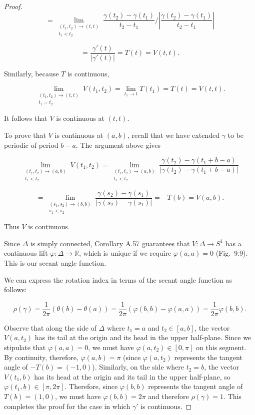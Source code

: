 \begin{proof}
\[
= \lim_{\substack{(t_1,t_2) \to (t,t) \\ t_1 < t_2}} \frac{\gamma(t_2) - \gamma(t_1)}{t_2 - t_1} \bigg/ \left| \frac{\gamma(t_2) - \gamma(t_1)}{t_2 - t_1} \right|
\]

\[
= \frac{\gamma'(t)}{|\gamma'(t)|} = T(t) = V(t,t).
\]

Similarly, because $T$ is continuous,

\[
\lim_{\substack{(t_1,t_2) \to (t,t) \\ t_1 = t_2}} V(t_1, t_2) = \lim_{t_1 \to t} T(t_1) = T(t) = V(t,t).
\]

It follows that $V$ is continuous at $(t,t)$.

To prove that $V$ is continuous at $(a,b)$, recall that we have extended $\gamma$ to be periodic of period $b - a$. The argument above gives

\[
\lim_{\substack{(t_1,t_2) \to (a,b) \\ t_1 < t_2}} V(t_1, t_2) = \lim_{\substack{(t_1,t_2) \to (a,b) \\ t_1 < t_2}} \frac{\gamma(t_2) - \gamma(t_1 + b - a)}{|\gamma(t_2) - \gamma(t_1 + b - a)|}
\]

\[
= \lim_{\substack{(s_1,s_2) \to (b,b) \\ s_1 < s_2}} \frac{\gamma(s_2) - \gamma(s_1)}{|\gamma(s_2) - \gamma(s_1)|} = -T(b) = V(a,b).
\]

Thus $V$ is continuous.

Since $\Delta$ is simply connected, Corollary A.57 guarantees that $V: \Delta \to S^1$ has a continuous lift $\varphi: \Delta \to \mathbb{R}$, which is unique if we require $\varphi(a,a) = 0$ (Fig.~9.9). This is our secant angle function.

We can express the rotation index in terms of the secant angle function as follows:

\[
\rho(\gamma) = \frac{1}{2\pi}(\theta(b) - \theta(a)) = \frac{1}{2\pi}(\varphi(b,b) - \varphi(a,a)) = \frac{1}{2\pi} \varphi(b,b).
\]

Observe that along the side of $\Delta$ where $t_1 = a$ and $t_2 \in [a,b]$, the vector $V(a,t_2)$ has its tail at the origin and its head in the upper half-plane. Since we stipulate that $\varphi(a,a) = 0$, we must have $\varphi(a,t_2) \in [0, \pi]$ on this segment. By continuity, therefore, $\varphi(a,b) = \pi$ (since $\varphi(a,t_2)$ represents the tangent angle of $-T(b) = (-1,0)$). Similarly, on the side where $t_2 = b$, the vector $V(t_1, b)$ has its head at the origin and its tail in the upper half-plane, so $\varphi(t_1, b) \in [\pi, 2\pi]$. Therefore, since $\varphi(b,b)$ represents the tangent angle of $T(b) = (1,0)$, we must have $\varphi(b,b) = 2\pi$ and therefore $\rho(\gamma) = 1$. This completes the proof for the case in which $\gamma'$ is continuous.


\end{proof}
